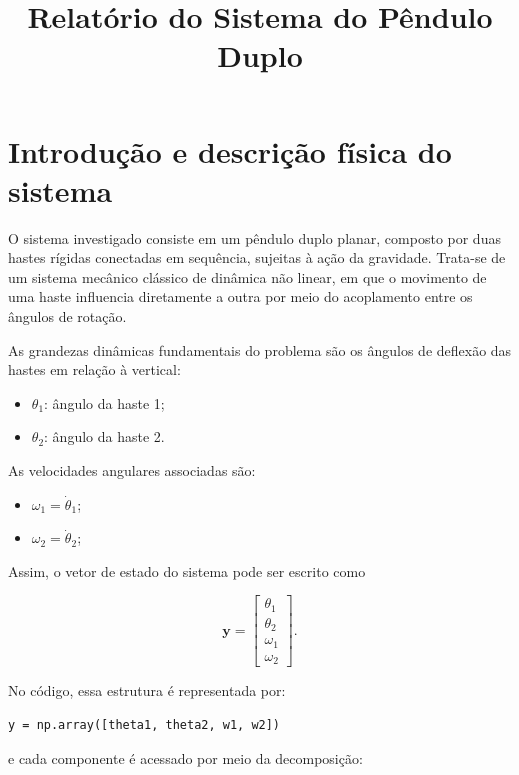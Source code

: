 \documentclass[12pt,a4paper]{article}
\title{Relatório do Sistema do Pêndulo Duplo}
\author{}
\date{}
\begin{document}
\maketitle

\section{Introdução e descrição física do sistema}

O sistema investigado consiste em um pêndulo duplo planar, composto por duas hastes rígidas conectadas em sequência, sujeitas à ação da gravidade. Trata-se de um sistema mecânico clássico de dinâmica não linear, em que o movimento de uma haste influencia diretamente a outra por meio do acoplamento entre os ângulos de rotação.

As grandezas dinâmicas fundamentais do problema são os ângulos de deflexão das hastes em relação à vertical:

\begin{itemize}
    \item $\theta_1$: ângulo da haste 1;
    \item $\theta_2$: ângulo da haste 2.
\end{itemize}

As velocidades angulares associadas são:

\begin{itemize}
    \item $\omega_1 = \dot{\theta}_1$;
    \item $\omega_2 = \dot{\theta}_2$;
\end{itemize}

Assim, o vetor de estado do sistema pode ser escrito como

\begin{equation}
\mathbf{y} = \begin{bmatrix}
\theta_1 \\
\theta_2 \\
\omega_1 \\
\omega_2
\end{bmatrix}.
\end{equation}

No código, essa estrutura é representada por:

\begin{lstlisting}
y = np.array([theta1, theta2, w1, w2])
\end{lstlisting}

e cada componente é acessado por meio da decomposição:
\end{document}
